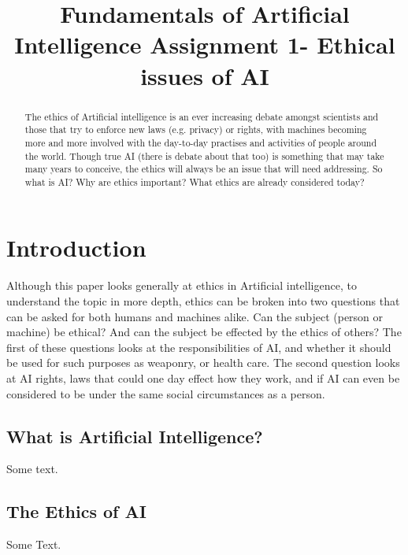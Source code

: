 \documentclass[article]{IEEEtran}
\begin{document}
\title{Fundamentals of Artificial Intelligence Assignment 1- Ethical issues of AI}

\author{
}

\maketitle

\begin{abstract}
The ethics of Artificial intelligence is an ever increasing debate amongst scientists and those that try to enforce new laws (e.g. privacy) or rights, with machines becoming more and more involved with the day-to-day practises and activities of people around the world. Though true AI (there is debate about that too) is something that may take many years to conceive, the ethics will always be an issue that will need addressing. So what is AI? Why are ethics important? What ethics are already considered today?
\end{abstract}

\section{Introduction}
Although this paper looks generally at ethics in Artificial intelligence, to understand the topic in more depth, ethics can be broken into two questions that can be asked for both humans and machines alike. Can the subject (person or machine) be ethical? And can the subject be effected by the ethics of others? The first of these questions looks at the responsibilities of AI, and whether it should be used for such purposes as weaponry, or health care. The second question looks at AI rights, laws that could one day effect how they work, and if AI can even be considered to be under the same social circumstances as a person.

\subsection{What is Artificial Intelligence?}
Some text.

\subsection{The Ethics of AI}
Some Text.
\end{document}
